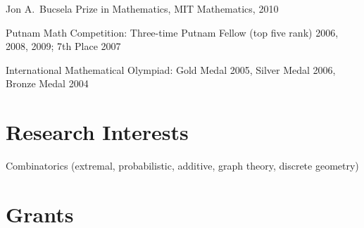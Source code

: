 \documentclass[11pt]{amsart}
\newcommand{\rightloc}[1]{\hfill {\raggedright #1}}
\begin{document}



Jon A.~Bucsela Prize in Mathematics, MIT Mathematics, 2010



Putnam Math Competition: Three-time Putnam Fellow (top five rank) 2006, 2008, 2009; 7th Place 2007



International Mathematical Olympiad: Gold Medal 2005, Silver Medal
2006, Bronze Medal 2004


%
%
%

%
%



\section*{Research Interests}

Combinatorics (extremal, probabilistic, additive, graph theory, discrete geometry)

\section*{Grants}
\end{document}
